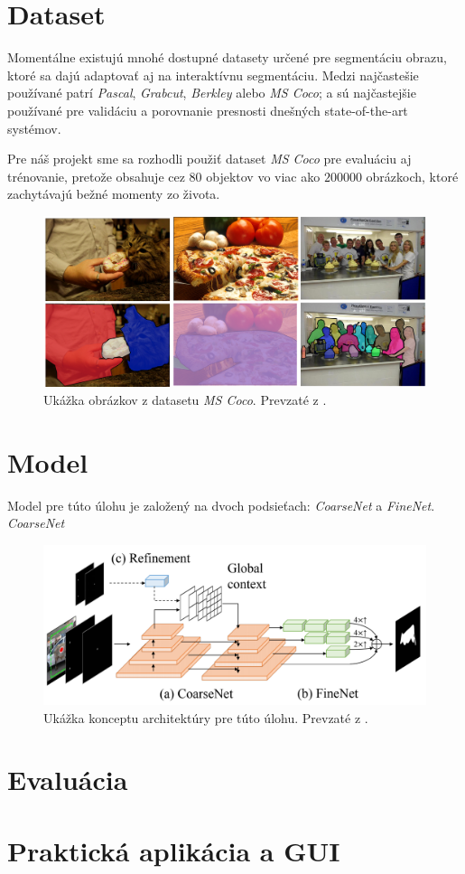 \documentclass [11pt, a4paper, twocolumn]{article}
\begin{document}
\section{Dataset}
Momentálne existujú mnohé dostupné datasety určené pre segmentáciu obrazu, ktoré sa dajú adaptovať aj na interaktívnu segmentáciu. Medzi najčastešie používané patrí \textit{Pascal}, \textit{Grabcut}, \textit{Berkley} alebo \textit{MS Coco}; a sú najčastejšie používané pre validáciu a porovnanie presnosti dnešných state-of-the-art systémov.

Pre náš projekt sme sa rozhodli použiť dataset \textit{MS Coco} pre evaluáciu aj trénovanie, pretože obsahuje cez $80$ objektov vo viac ako $200000$ obrázkoch, ktoré zachytávajú bežné momenty zo života.

\begin{figure}[H]
\centering
\includegraphics[width=\linewidth]{coco}
\caption{Ukážka obrázkov z datasetu \textit{MS Coco}. Prevzaté z \cite{coco}.}
\end{figure}

\section{Model}

Model pre túto úlohu je založený na dvoch podsieťach: \textit{CoarseNet} a \textit{FineNet}. \textit{CoarseNet} 
\begin{figure}[H]
\centering
\includegraphics[width=\linewidth]{architecture}
\caption{Ukážka konceptu architektúry pre túto úlohu. Prevzaté z \cite{zhang_liew_wei_wei_zhao_2020}.}
\end{figure}



\section{Evaluácia}

\section{Praktická aplikácia a GUI}


\renewcommand{\refname}{Použitá literatúra}

\end{document}
